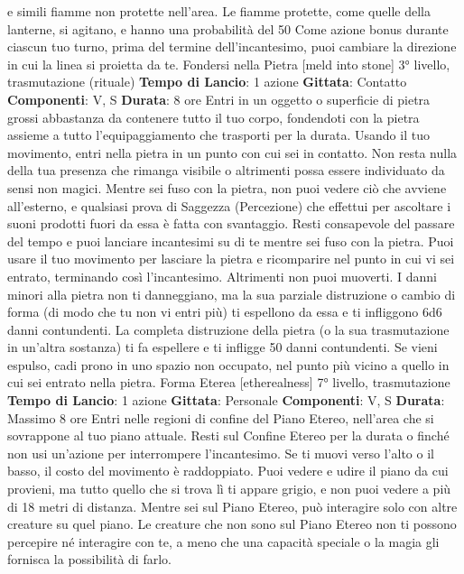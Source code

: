 \begin{multicols}{2}
e simili fiamme non protette nell’area. Le fiamme
protette, come quelle della lanterne, si agitano, e hanno
una probabilità del 50%
Come azione bonus durante ciascun tuo turno, prima
del termine dell’incantesimo, puoi cambiare la direzione
in cui la linea si proietta da te.
Fondersi nella Pietra
[meld into stone]
3° livello, trasmutazione (rituale)
\textbf{Tempo di Lancio}: 1 azione
\textbf{Gittata}: Contatto
\textbf{Componenti}: V, S
\textbf{Durata}: 8 ore
Entri in un oggetto o superficie di pietra grossi
abbastanza da contenere tutto il tuo corpo, fondendoti
con la pietra assieme a tutto l’equipaggiamento che
trasporti per la durata. Usando il tuo movimento, entri
nella pietra in un punto con cui sei in contatto. Non
resta nulla della tua presenza che rimanga visibile o
altrimenti possa essere individuato da sensi non magici.
Mentre sei fuso con la pietra, non puoi vedere ciò che
avviene all’esterno, e qualsiasi prova di Saggezza
(Percezione) che effettui per ascoltare i suoni prodotti
fuori da essa è fatta con svantaggio. Resti consapevole
del passare del tempo e puoi lanciare incantesimi su di
te mentre sei fuso con la pietra. Puoi usare il tuo
movimento per lasciare la pietra e ricomparire nel punto
in cui vi sei entrato, terminando così l’incantesimo.
Altrimenti non puoi muoverti.
I danni minori alla pietra non ti danneggiano, ma la sua
parziale distruzione o cambio di forma (di modo che tu
non vi entri più) ti espellono da essa e ti infliggono 6d6
danni contundenti. La completa distruzione della pietra
(o la sua trasmutazione in un’altra sostanza) ti fa
espellere e ti infligge 50 danni contundenti. Se vieni
espulso, cadi prono in uno spazio non occupato, nel
punto più vicino a quello in cui sei entrato nella pietra.
Forma Eterea
[etherealness]
7° livello, trasmutazione
\textbf{Tempo di Lancio}: 1 azione
\textbf{Gittata}: Personale
\textbf{Componenti}: V, S
\textbf{Durata}: Massimo 8 ore
Entri nelle regioni di confine del Piano Etereo, nell’area
che si sovrappone al tuo piano attuale. Resti sul
Confine Etereo per la durata o finché non usi un’azione
per interrompere l’incantesimo. Se ti muovi verso l’alto
o il basso, il costo del movimento è raddoppiato. Puoi
vedere e udire il piano da cui provieni, ma tutto quello
che si trova lì ti appare grigio, e non puoi vedere a più
di 18 metri di distanza.
Mentre sei sul Piano Etereo, può interagire solo con
altre creature su quel piano. Le creature che non sono
sul Piano Etereo non ti possono percepire né interagire
con te, a meno che una capacità speciale o la magia gli
fornisca la possibilità di farlo.

\end{multicols}
